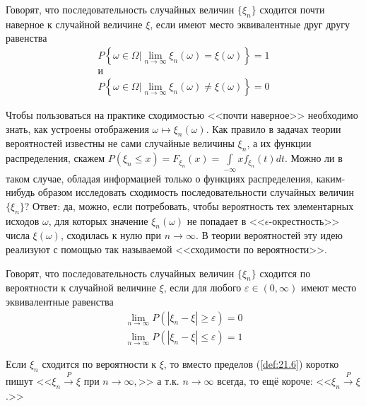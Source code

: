\begin{definition}
\label{def:21.4}
	Говорят, что последовательность случайных величин $\{\xi_n\}$ сходится почти наверное к случайной величине $\xi$, если имеют
место эквивалентные друг другу равенства
\begin{gather*}
	P\left\{\omega\in\Omega| \lim\limits_{n\to\infty}\xi_n(\omega)=\xi(\omega) \right\}=1 \\
	\text{и} \\
	P\left\{\omega\in\Omega| \lim\limits_{n\to\infty}\xi_n(\omega)\neq\xi(\omega) \right\}=0
\end{gather*}
\end{definition}
\begin{zam}
\label{zam:21.5}
Чтобы пользоваться на практике сходимостью <<почти наверное>> необходимо знать, как устроены отображения $\omega \mapsto \xi_n(\omega)$.
Как правило в задачах теории вероятностей известны не сами случайные
величины $\xi_n$, а их функции распределения, скажем $P(\xi_n \leqslant x) = F_{\xi_n}(x) =\int\limits_{-\infty}{x}f_{\xi_n}(t)dt$. Можно ли в таком случае, обладая информацией только о функциях распределения, каким-нибудь образом исследовать сходимость последовательности случайных величин $\{\xi_n\}$? Ответ: да, можно, если потребовать, чтобы вероятность тех элементарных исходов $\omega$, для которых значение $\xi_n(\omega)$ не попадает в <<$\epsilon$-окрестность>> числа $\xi(\omega)$, сходилась к нулю при $n \to \infty$. В теории вероятностей эту идею реализуют с помощью так называемой <<сходимости по вероятности>>.
\end{zam}

\begin{definition}
\label{def:21.6}
	Говорят, что последовательность случайных величин $\{\xi_n\}$ сходится по вероятности к случайной величине $\xi$, если для любого
$\varepsilon \in (0,\infty)$ имеют место эквивалентные равенства
\begin{gather*}
	\lim_{n\to\infty}P(|\xi_n- \xi|\geqslant \varepsilon)=0 \\
	\lim_{n\to\infty}P(|\xi_n- \xi|\leqslant \varepsilon)=1 \tag{*}
\end{gather*}

\end{definition}

Если ${\xi_n}$ сходится по вероятности к $\xi$, то вместо пределов (\ref{def:21.6}) коротко пишут <<$\xi_n\stackrel{P}{\to} \xi$ при $n \to \infty,$>> а т.к. $n \to \infty$ всегда, то ещё короче: <<$\xi_n\stackrel{P}{\to} \xi$.>>

